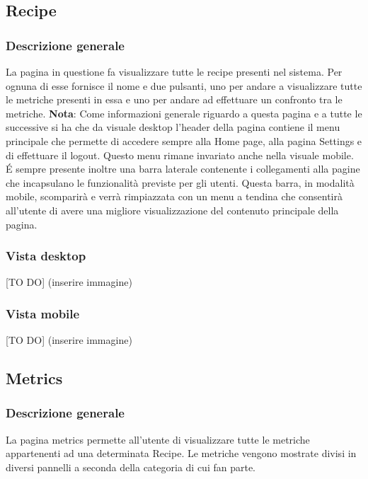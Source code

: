 	\subsection{Recipe} %
	\label{sub:recipe}
		\subsubsection{Descrizione generale} %
		La pagina in questione fa visualizzare tutte le recipe presenti nel sistema. Per ognuna di esse fornisce il nome e due pulsanti, uno per andare a visualizzare tutte le metriche presenti in essa e uno per andare ad effettuare un confronto tra le metriche. \newline
		\textbf{Nota}: Come informazioni generale riguardo a questa pagina e a tutte le successive si ha che da visuale desktop l'header della pagina contiene il menu principale che permette di accedere sempre alla Home page, alla pagina Settings e di effettuare il logout. Questo menu rimane invariato anche nella visuale mobile. \newline
		\'E sempre presente inoltre una barra laterale contenente i collegamenti alla pagine che incapsulano le funzionalità previste per gli utenti. Questa barra, in modalità mobile, scomparirà e verrà rimpiazzata con un menu a tendina che consentirà all'utente di avere una migliore visualizzazione del contenuto principale della pagina.

		\subsubsection{Vista desktop} %
		[TO DO] (inserire immagine)

		\subsubsection{Vista mobile} %
		[TO DO] (inserire immagine)

	\subsection{Metrics} %
	\label{sub:metrics}
		\subsubsection{Descrizione generale} %
		La pagina metrics permette all'utente di visualizzare tutte le metriche appartenenti ad una determinata Recipe. Le metriche vengono mostrate divisi in diversi pannelli a seconda della categoria di cui fan parte.

